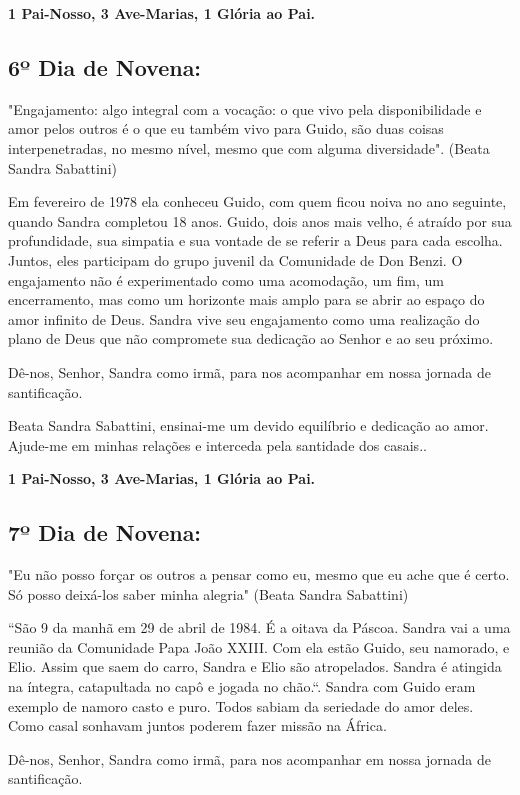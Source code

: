 \documentclass[a4paper,14pt]{extarticle} \usepackage[utf8]{inputenc}
\begin{document}
\textbf{1 Pai-Nosso, 3 Ave-Marias,  1 Glória ao Pai.}


\subsection{6º Dia de Novena:} "Engajamento: algo integral com a vocação: o que vivo pela disponibilidade e amor pelos outros é o que eu também vivo para Guido, são duas coisas interpenetradas, no mesmo nível, mesmo que com alguma diversidade". (Beata Sandra Sabattini)

Em fevereiro de 1978 ela conheceu Guido, com quem ficou noiva no ano seguinte, quando Sandra completou 18 anos. Guido, dois anos mais velho, é atraído por sua profundidade, sua simpatia e sua vontade de se referir a Deus para cada escolha. Juntos, eles participam do grupo juvenil da Comunidade de Don Benzi. O engajamento não é experimentado como uma acomodação, um fim, um encerramento, mas como um horizonte mais amplo para se abrir ao espaço do amor infinito de Deus. Sandra vive seu engajamento como uma realização do plano de Deus que não compromete sua dedicação ao Senhor e ao seu próximo.


Dê-nos, Senhor, Sandra como irmã, para nos acompanhar em nossa jornada de santificação.


Beata Sandra Sabattini, ensinai-me um devido equilíbrio e dedicação ao amor. Ajude-me em minhas relações e interceda pela santidade dos casais..


\textbf{1 Pai-Nosso, 3 Ave-Marias,  1 Glória ao Pai.}


\subsection{7º Dia de Novena:} "Eu não posso forçar os outros a pensar como eu, mesmo que eu ache que é certo. Só posso deixá-los saber minha alegria" (Beata Sandra Sabattini)

“São 9 da manhã em 29 de abril de 1984. É a oitava da Páscoa. Sandra vai a uma reunião da Comunidade Papa João XXIII. Com ela estão Guido, seu namorado, e Elio. Assim que saem do carro, Sandra e Elio são atropelados. Sandra é atingida na íntegra, catapultada no capô e jogada no chão.“. Sandra com Guido eram exemplo de namoro casto e puro. Todos sabiam da seriedade do amor deles. Como casal sonhavam juntos poderem fazer missão na África. 


Dê-nos, Senhor, Sandra como irmã, para nos acompanhar em nossa jornada de santificação.
\end{document}
